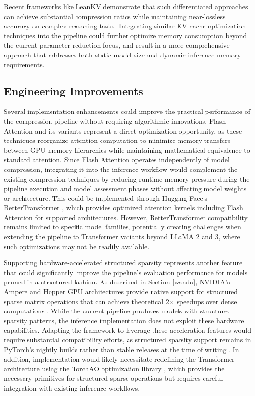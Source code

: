 Recent frameworks like LeanKV \cite{kvcompr2} demonstrate that such differentiated approaches can achieve substantial compression ratios while maintaining near-lossless accuracy on complex reasoning tasks. Integrating similar KV cache optimization techniques into the pipeline could further optimize memory consumption beyond the current parameter reduction focus, and result in a more comprehensive approach that addresses both static model size and dynamic inference memory requirements.

\subsection{Engineering Improvements} \label{sec:future_work_engineering}
Several implementation enhancements could improve the practical performance of the compression pipeline without requiring algorithmic innovations. Flash Attention \cite{flash_attention} and its variants represent a direct optimization opportunity, as these techniques reorganize attention computation to minimize memory transfers between GPU memory hierarchies while maintaining mathematical equivalence to standard attention. Since Flash Attention operates independently of model compression, integrating it into the inference workflow would complement the existing compression techniques by reducing runtime memory pressure during the pipeline execution and model assessment phases without affecting model weights or architecture. This could be implemented through Hugging Face's BetterTransformer \cite{bettertransformer}, which provides optimized attention kernels including Flash Attention for supported architectures. However, BetterTransformer compatibility remains limited to specific model families, potentially creating challenges when extending the pipeline to Transformer variants beyond LLaMA 2 and 3, where such optimizations may not be readily available.

Supporting hardware-accelerated structured sparsity represents another feature that could significantly improve the pipeline's evaluation performance for models pruned in a structured fashion. As described in Section \ref{wanda}, NVIDIA's Ampere and Hopper GPU architectures provide native support for structured sparse matrix operations that can achieve theoretical 2$\times$ speedups over dense computations \cite{nvidia-width}. While the current pipeline produces models with structured sparsity patterns, the inference implementation does not exploit these hardware capabilities. Adapting the framework to leverage these acceleration features would require substantial compatibility efforts, as structured sparsity support remains in PyTorch's nightly builds rather than stable releases at the time of writing \cite{pytorch_sparsity}. In addition, implementation would likely necessitate redefining the Transformer architecture using the TorchAO optimization library \cite{torchao}, which provides the necessary primitives for structured sparse operations but requires careful integration with existing inference workflows.

